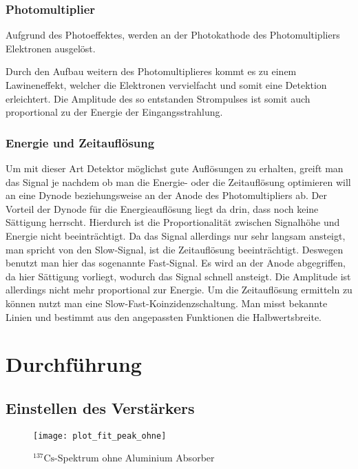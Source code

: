 \documentclass[11pt, ngerman, fleqn, DIV=15, headinclude, BCOR=2cm]{scrreprt}
\newcommand{\plotwidth}{0.8\linewidth}
\begin{document}
\subsection{Photomultiplier}
Aufgrund des Photoeffektes, werden an der Photokathode des Photomultipliers
Elektronen ausgelöst.

Durch den Aufbau weitern des Photomultiplieres kommt es zu einem Lawineneffekt,
welcher die Elektronen vervielfacht und somit eine Detektion erleichtert.
Die Amplitude des so entstanden Strompulses ist somit auch proportional zu der
Energie der Eingangsstrahlung.

\subsection{Energie und Zeitauflösung}
Um mit dieser Art Detektor möglichst gute Auflösungen zu erhalten, greift man
das Signal je nachdem ob man die Energie- oder die Zeitauflösung optimieren will
an eine Dynode beziehungsweise an der Anode des Photomultipliers ab.
Der Vorteil der Dynode für die Energieauflösung liegt da drin, dass noch keine
Sättigung herrscht. Hierdurch ist die Proportionalität zwischen Signalhöhe und
Energie nicht beeinträchtigt. Da das Signal allerdings nur sehr langsam
ansteigt, man spricht von den Slow-Signal, ist die Zeitauflösung beeinträchtigt.
Deswegen benutzt man hier das sogenannte Fast-Signal. Es wird an der Anode
abgegriffen, da hier Sättigung vorliegt, wodurch das Signal schnell ansteigt.
Die Amplitude ist allerdings nicht mehr proportional zur Energie.
Um die Zeitauflösung ermitteln zu können nutzt man eine
Slow-Fast-Koinzidenzschaltung. Man misst bekannte Linien und bestimmt aus den
angepassten Funktionen die Halbwertsbreite.

\chapter{Durchführung}

\section{Einstellen des Verstärkers}
\begin{figure}[h]
    \centering
    \texttt{[image: plot\_fit\_peak\_ohne]}
    \caption{%
	    $^{137}\text{Cs}$-Spektrum ohne Aluminium Absorber
   }
    \label{fig:plot_fit_peak_ohne}
\end{figure}
\end{document}
